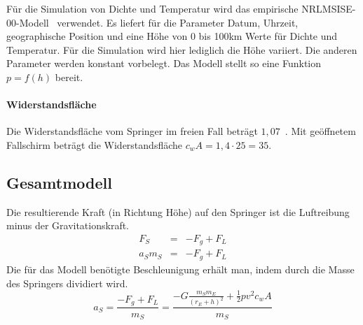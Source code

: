 Für die Simulation von Dichte und Temperatur wird das empirische NRLMSISE-00-Modell~\cite{nrlmsise00:goddardspaceflightcenter} verwendet.
Es liefert für die Parameter Datum, Uhrzeit, geographische Position und eine Höhe von 0 bis 100km Werte für Dichte und Temperatur.
Für die Simulation wird hier lediglich die Höhe variiert.
Die anderen Parameter werden konstant vorbelegt.
Das Modell stellt so eine Funktion $p=f(h)$ bereit.

\paragraph{Widerstandsfläche}
Die Widerstandsfläche vom Springer im freien Fall beträgt $1,07$~\cite[59]{redbulletin:stratosspecialde}.
Mit geöffnetem Fallschirm beträgt die Widerstandsfläche $c_wA=1,4\cdot25=35$.

\subsection{Gesamtmodell}

Die resultierende Kraft (in Richtung Höhe) auf den Springer ist die Luftreibung minus der Gravitationskraft.
\begin{eqnarray*}
  F_S &=& -F_g+F_L \\
  a_Sm_S &=& -F_g+F_L
\end{eqnarray*}
Die für das Modell benötigte Beschleunigung erhält man, indem durch die Masse des Springers dividiert wird.
\begin{equation}
  a_S = \frac{-F_g+F_L}{m_S} = \frac{-G\frac{m_Sm_E}{(r_E+h)^2}+\frac{1}{2}pv^2c_wA}{m_S}
\end{equation}
